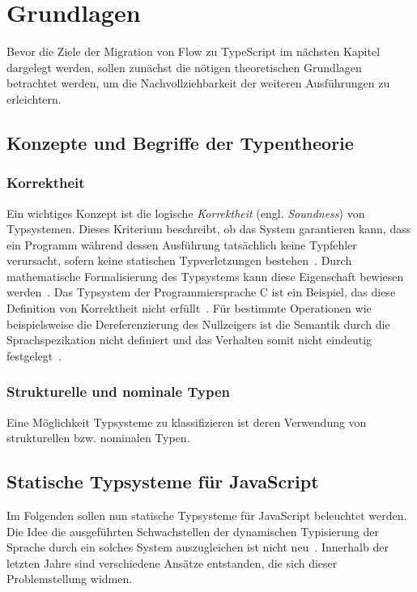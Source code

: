 \chapter{Grundlagen}
\label{chap:basics}

Bevor die Ziele der Migration von Flow zu TypeScript im nächsten Kapitel dargelegt werden, sollen zunächst die nötigen theoretischen Grundlagen betrachtet werden, um die Nachvollziehbarkeit der weiteren Ausführungen zu erleichtern.

\section{Konzepte und Begriffe der Typentheorie}

\subsection{Korrektheit}
Ein wichtiges Konzept ist die logische \emph{Korrektheit} (engl. \emph{Soundness}) von Typsystemen. Dieses Kriterium beschreibt, ob das System garantieren kann, dass ein Programm während dessen Ausführung tatsächlich keine Typfehler verursacht, sofern keine statischen Typverletzungen bestehen~\autocite{WRIGHT:1994}. Durch mathematische Formalisierung des Typsystems kann diese Eigenschaft bewiesen werden~\autocite[7]{CARDELLI:TYPE_SYSTEMS}.
Das Typsystem der Programmiersprache C ist ein Beispiel, das diese Definition von Korrektheit nicht erfüllt~\autocite{SMITH:TYPE_SYSTEMS}. Für bestimmte Operationen wie beispielsweise die Dereferenzierung des Nullzeigers ist die Semantik durch die Sprachspezikation nicht definiert und das Verhalten somit nicht eindeutig festgelegt~\autocite[79]{ISO:C99}.

\subsection{Strukturelle und nominale Typen}
Eine Möglichkeit Typsysteme zu klassifizieren ist deren Verwendung von strukturellen bzw. nominalen Typen.



\section{Statische Typsysteme für JavaScript}
\label{sec:static-typesystems-for-js}

Im Folgenden sollen nun statische Typsysteme für JavaScript beleuchtet werden. Die Idee die ausgeführten Schwachstellen der dynamischen Typisierung der Sprache durch ein solches System auszugleichen ist nicht neu~\autocite[2]{FLOW:PAPER}. Innerhalb der letzten Jahre sind verschiedene Ansätze entstanden, die sich dieser Problemstellung widmen.

